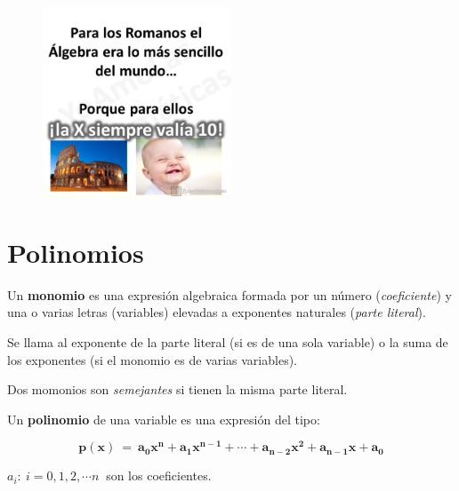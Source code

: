 \begin{figure}[H]
	\centering
	\includegraphics[width=0.5\textwidth]{img-pol/pol02.png}
\end{figure}



\vspace{1cm}
\section{Polinomios}
\vspace{0.5cm}


Un \textbf{monomio} es una expresión algebraica formada por un número (\emph{coeficiente}) y una o varias letras (variables) elevadas a exponentes naturales (\emph{parte literal}).

Se llama  al exponente de la parte literal (si es de una sola variable) o la suma de los exponentes (si el monomio es de varias variables).

Dos momonios son \emph{semejantes} si tienen la misma parte literal.

\vspace{5mm}
\begin{definition}[ Polinomio]

Un \textbf{polinomio} de una variable es una expresión del tipo:

$$\boldsymbol{ p(x)\ = \ a_0x^n+a_1x^{n-1}+\cdots +a_{n-2}x^2+a_{n-1}x+a_0 }$$	

$a_i: \ i=0,1,2,\cdots n \ $ son los coeficientes.

\end{definition}

